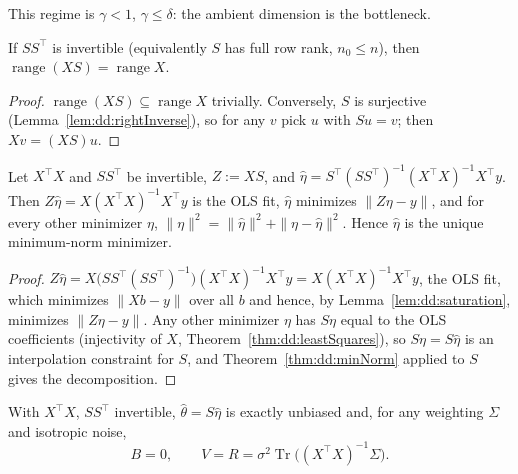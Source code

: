 This regime is $\gamma<1$, $\gamma\le\delta$: the ambient dimension is the bottleneck.

\begin{lemma}\label{lem:dd:saturation}
  \leanok
If $SS^\top$ is invertible (equivalently $S$ has full row rank, $n_0\le n$), then $\operatorname{range}(XS)=\operatorname{range}X$.
\end{lemma}

\begin{proof}
  \leanok
$\operatorname{range}(XS)\subseteq\operatorname{range}X$ trivially. Conversely, $S$ is surjective
(Lemma~\ref{lem:dd:rightInverse}), so for any $v$ pick $u$ with $Su=v$; then $Xv=(XS)u$.
\end{proof}

\begin{theorem}\label{thm:dd:ambientOLS}
  \leanok
Let $X^\top X$ and $SS^\top$ be invertible, $Z:=XS$, and
$\hat\eta=S^\top(SS^\top)^{-1}(X^\top X)^{-1}X^\top y$. Then $Z\hat\eta=X(X^\top X)^{-1}X^\top y$ is the OLS fit,
$\hat\eta$ minimizes $\|Z\eta-y\|$, and for every other minimizer $\eta$,
$\|\eta\|^2=\|\hat\eta\|^2+\|\eta-\hat\eta\|^2$. Hence $\hat\eta$ is the unique minimum-norm minimizer.
\end{theorem}

\begin{proof}
  \leanok
$Z\hat\eta=X\bigl(SS^\top(SS^\top)^{-1}\bigr)(X^\top X)^{-1}X^\top y=X(X^\top X)^{-1}X^\top y$, the OLS fit, which minimizes
$\|Xb-y\|$ over all $b$ and hence, by Lemma~\ref{lem:dd:saturation}, minimizes $\|Z\eta-y\|$. Any other minimizer $\eta$ has
$S\eta$ equal to the OLS coefficients (injectivity of $X$, Theorem~\ref{thm:dd:leastSquares}), so $S\eta=S\hat\eta$ is an
interpolation constraint for $S$, and Theorem~\ref{thm:dd:minNorm} applied to $S$ gives the decomposition.
\end{proof}

\begin{theorem}\label{thm:dd:ambientBV}
  \leanok
With $X^\top X$, $SS^\top$ invertible, $\hat\theta=S\hat\eta$ is exactly unbiased and, for any weighting $\Sigma$ and isotropic noise,
\[
  B=0,\qquad V=R=\sigma^2\operatorname{Tr}\bigl((X^\top X)^{-1}\Sigma\bigr).
\]
\end{theorem}

